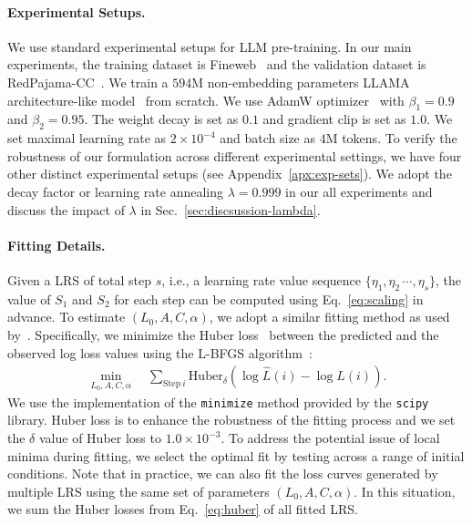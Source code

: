 \paragraph{Experimental Setups.}
We use standard experimental setups for LLM pre-training. In our main experiments,
the training dataset is Fineweb~\citep{penedo2024fineweb} and the validation
dataset is RedPajama-CC~\citep{together2023redpajama}. We train a $594$M non-embedding parameters LLAMA
architecture-like model~\citep{touvron2023llama} from scratch. We use AdamW optimizer~\citep{loshchilov2017decoupled} with $\beta_1 = 0.9$ and $\beta_2 = 0.95$. The weight decay is set as $0.1$ and gradient clip is set as $1.0$. We set maximal learning rate as $2\times10^{-4}$ and batch size as $4$M tokens.
To verify the robustness of our formulation across different experimental settings, we have four other distinct experimental setups (see Appendix~\ref{apx:exp-sets}). 
We adopt the decay factor or learning rate annealing $\lambda=0.999$ in our all experiments and discuss the impact of $\lambda$ in Sec.~\ref{sec:discsussion-lambda}.

\paragraph{Fitting Details.}
Given a LRS of total step $s$, i.e., a learning rate value sequence $\{\eta_1, \eta_2\, \cdots, \eta_s\}$, the value of $S_1$ and $S_2$ for each step can be computed using Eq.~\ref{eq:scaling} in advance.
To estimate $(L_0, A, C, \alpha)$, we adopt a similar fitting method as used by~\citet{hoffmann2022training}. Specifically, we minimize the Huber loss~\citep{huber-loss} between the predicted and the observed log loss values using the L-BFGS algorithm~\citep{L-BFGS}:
\begin{equation}
\label{eq:huber}
\begin{aligned}
\min_{L_0,A,C,\alpha}\quad\sum_{\mathrm{Step~} i}\mathrm{Huber}_\delta\left(\log\hat{L}(i)-\log L(i)\right).
\end{aligned}
\end{equation}
We use the implementation of the \texttt{minimize} method provided by the \texttt{scipy} library. Huber loss is to enhance the robustness of the fitting process and we set the $\delta$ value of Huber loss to $1.0\times 10^{-3}$. To address the potential issue of local minima during fitting, we select the optimal fit by testing across a range of initial conditions. Note that in practice, we can also fit the loss curves generated by multiple LRS using the same set of parameters $(L_0, A, C, \alpha)$. In this situation, we sum the Huber losses from Eq.~\ref{eq:huber} of all fitted LRS.

